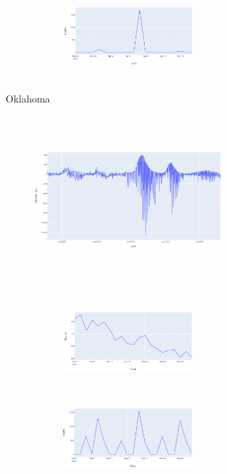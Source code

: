 \documentclass[11pt,twocolumn,letterpaper]{article}
\begin{document}
\begin{figure}
\begin{subfigure}{0.48\linewidth}
\begin{subfigure}{0.48\linewidth}
\begin{subfigure}{\linewidth}
            \vfill
        \end{subfigure}
        \begin{subfigure}{\linewidth}
            \centering
            \includegraphics[width=\linewidth, height=3.15cm]{images/ok_jhu.PNG}
            \vfill
        \end{subfigure}
    \end{subfigure}
    \caption{Oklahoma}
\end{subfigure}
\hfill
\begin{subfigure}{0.48\linewidth}
    \begin{subfigure}{0.48\linewidth}
        \centering
        \includegraphics[width=\linewidth, height=6.3cm]{images/fl_overview.PNG}
    \end{subfigure}
    \hfill
    \begin{subfigure}{0.48\linewidth}
        \begin{subfigure}{\linewidth}
            \centering
            \includegraphics[width=\linewidth, height=3.15cm]{images/fl_cdc.PNG}
            \vfill
        \end{subfigure}
        \begin{subfigure}{\linewidth}
            \centering
            \includegraphics[width=\linewidth, height=3.15cm]{images/fl_jhu.PNG}

\end{subfigure}
\end{subfigure}
\end{subfigure}
\end{figure}
\end{document}
